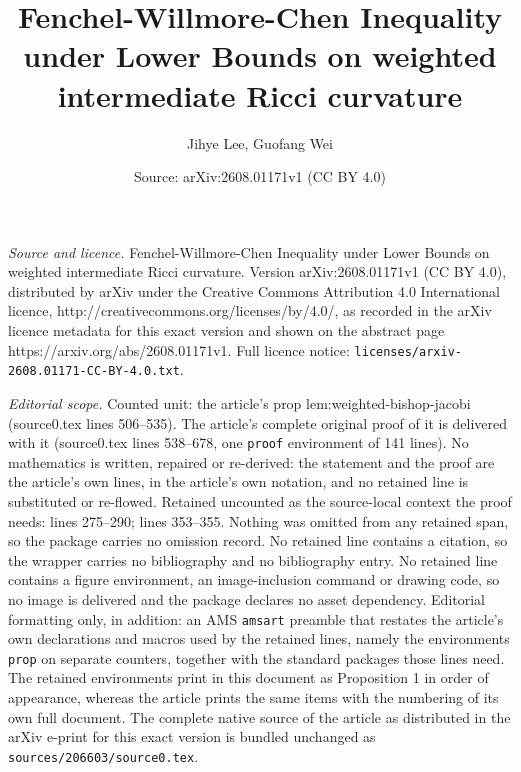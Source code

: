 \documentclass[10pt,a4paper]{amsart}
\title{Fenchel-Willmore-Chen Inequality under Lower Bounds on weighted intermediate Ricci curvature}
\author{Jihye Lee, Guofang Wei}
\date{Source: arXiv:2608.01171v1 (CC BY 4.0)}
\begin{document}
\maketitle

\noindent\emph{Source and licence.} Fenchel-Willmore-Chen Inequality under Lower Bounds on weighted intermediate Ricci curvature. Version arXiv:2608.01171v1 (CC BY 4.0), distributed by arXiv under the Creative Commons Attribution 4.0 International licence, http://creativecommons.org/licenses/by/4.0/, as recorded in the arXiv licence metadata for this exact version and shown on the abstract page https://arxiv.org/abs/2608.01171v1. Full licence notice: \texttt{licenses/arxiv-2608.01171-CC-BY-4.0.txt}.\par\smallskip

\noindent\textit{Editorial scope.} Counted unit: the article's prop lem:weighted-bishop-jacobi (source0.tex lines 506--535). The article's complete original proof of it is delivered with it (source0.tex lines 538--678, one \texttt{proof} environment of 141 lines). No mathematics is written, repaired or re-derived: the statement and the proof are the article's own lines, in the article's own notation, and no retained line is substituted or re-flowed.  Retained uncounted as the source-local context the proof needs: lines 275--290; lines 353--355.  Nothing was omitted from any retained span, so the package carries no omission record.  No retained line contains a citation, so the wrapper carries no bibliography and no bibliography entry.  No retained line contains a figure environment, an image-inclusion command or drawing code, so no image is delivered and the package declares no asset dependency.  Editorial formatting only, in addition: an AMS \texttt{amsart} preamble that restates the article's own declarations and macros used by the retained lines, namely the environments \texttt{prop} on separate counters, together with the standard packages those lines need.  The retained environments print in this document as Proposition 1 in order of appearance, whereas the article prints the same items with the numbering of its own full document.  The complete native source of the article as distributed in the arXiv e-print for this exact version is bundled unchanged as \texttt{sources/206603/source0.tex}.
\end{document}
